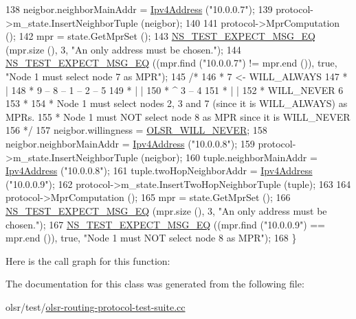\begin{DoxyCode}
138   neigbor.neighborMainAddr = \hyperlink{classns3_1_1Ipv4Address}{Ipv4Address} (\textcolor{stringliteral}{"10.0.0.7"});
139   protocol->m\_state.InsertNeighborTuple (neigbor);
140 
141   protocol->MprComputation ();
142   mpr = state.GetMprSet ();
143   \hyperlink{group__testing_ga7304ba46a28d8cf08dfdfd6499cf7068}{NS\_TEST\_EXPECT\_MSG\_EQ} (mpr.size (), 3, \textcolor{stringliteral}{"An only address must be chosen."});
144   \hyperlink{group__testing_ga7304ba46a28d8cf08dfdfd6499cf7068}{NS\_TEST\_EXPECT\_MSG\_EQ} ((mpr.find (\textcolor{stringliteral}{"10.0.0.7"}) != mpr.end ()), \textcolor{keyword}{true}, \textcolor{stringliteral}{"Node 1 must
       select node 7 as MPR"});
145   \textcolor{comment}{/*}
146 \textcolor{comment}{   *                7 <- WILL\_ALWAYS}
147 \textcolor{comment}{   *                |}
148 \textcolor{comment}{   *      9 -- 8 -- 1 -- 2 -- 5}
149 \textcolor{comment}{   *                |    |}
150 \textcolor{comment}{   *           ^    3 -- 4}
151 \textcolor{comment}{   *           |    |}
152 \textcolor{comment}{   *   WILL\_NEVER   6}
153 \textcolor{comment}{   *}
154 \textcolor{comment}{   * Node 1 must select nodes 2, 3 and 7 (since it is WILL\_ALWAYS) as MPRs.}
155 \textcolor{comment}{   * Node 1 must NOT select node 8 as MPR since it is WILL\_NEVER}
156 \textcolor{comment}{   */}
157   neigbor.willingness = \hyperlink{olsr-routing-protocol-test-suite_8cc_a146d2c103abd49bdfad44b4424769696}{OLSR\_WILL\_NEVER};
158   neigbor.neighborMainAddr = \hyperlink{classns3_1_1Ipv4Address}{Ipv4Address} (\textcolor{stringliteral}{"10.0.0.8"});
159   protocol->m\_state.InsertNeighborTuple (neigbor);
160   tuple.neighborMainAddr = \hyperlink{classns3_1_1Ipv4Address}{Ipv4Address} (\textcolor{stringliteral}{"10.0.0.8"});
161   tuple.twoHopNeighborAddr = \hyperlink{classns3_1_1Ipv4Address}{Ipv4Address} (\textcolor{stringliteral}{"10.0.0.9"});
162   protocol->m\_state.InsertTwoHopNeighborTuple (tuple);
163 
164   protocol->MprComputation ();
165   mpr = state.GetMprSet ();
166   \hyperlink{group__testing_ga7304ba46a28d8cf08dfdfd6499cf7068}{NS\_TEST\_EXPECT\_MSG\_EQ} (mpr.size (), 3, \textcolor{stringliteral}{"An only address must be chosen."});
167   \hyperlink{group__testing_ga7304ba46a28d8cf08dfdfd6499cf7068}{NS\_TEST\_EXPECT\_MSG\_EQ} ((mpr.find (\textcolor{stringliteral}{"10.0.0.9"}) == mpr.end ()), \textcolor{keyword}{true}, \textcolor{stringliteral}{"Node 1 must NOT
       select node 8 as MPR"});
168 \}
\end{DoxyCode}


Here is the call graph for this function\+:




The documentation for this class was generated from the following file\+:\begin{DoxyCompactItemize}
\item 
olsr/test/\hyperlink{olsr-routing-protocol-test-suite_8cc}{olsr-\/routing-\/protocol-\/test-\/suite.\+cc}\end{DoxyCompactItemize}
